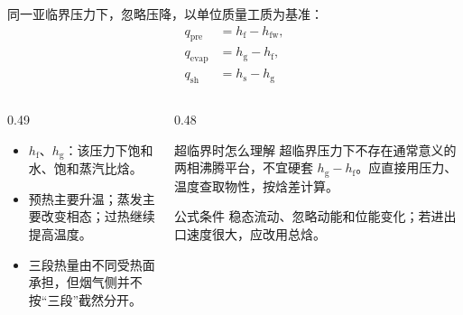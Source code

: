 \begin{frame}[t,shrink]{}
同一亚临界压力下，忽略压降，以单位质量工质为基准：
$$
\begin{aligned}
q_{\mathrm{pre}} &= h_{\mathrm{f}}-h_{\mathrm{fw}},\\
q_{\mathrm{evap}} &= h_{\mathrm{g}}-h_{\mathrm{f}},\\
q_{\mathrm{sh}} &= h_{\mathrm{s}}-h_{\mathrm{g}}
\end{aligned}
$$
\begin{columns}[T,onlytextwidth]
\begin{column}{0.49\textwidth}
  \begin{itemize}
    \item \(h_{\mathrm{f}}\)、\(h_{\mathrm{g}}\)：该压力下饱和水、饱和蒸汽比焓。
    \item 预热主要升温；蒸发主要改变相态；过热继续提高温度。
    \item 三段热量由不同受热面承担，但烟气侧并不按“三段”截然分开。
  \end{itemize}
\end{column}
\begin{column}{0.48\textwidth}
  \begin{amberbox}{超临界时怎么理解}
  \small 超临界压力下不存在通常意义的两相沸腾平台，不宜硬套 \(h_{\mathrm{g}}-h_{\mathrm{f}}\)。应直接用压力、温度查取物性，按焓差计算。
  \end{amberbox}
  \vspace{0.8mm}
  \begin{keybox}{公式条件}
  \small 稳态流动、忽略动能和位能变化；若进出口速度很大，应改用总焓。
  \end{keybox}
\end{column}
\end{columns}
\end{frame}

